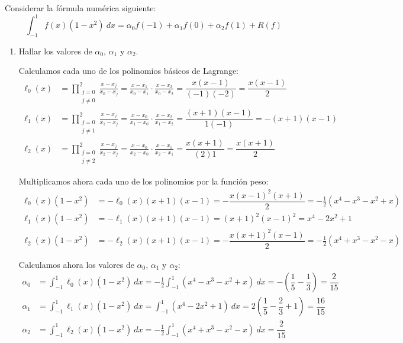 \begin{ejercicio}
    Considerar la fórmula numérica siguiente:
    \begin{equation*}
        \int_{-1}^1f(x)(1-x^2)\ dx=\alpha_0f(-1)+\alpha_1f(0)+\alpha_2f(1)+R(f)
    \end{equation*}
    \begin{enumerate}
        \item Hallar los valores de $\alpha_0$, $\alpha_1$ y $\alpha_2$.
        
        Calculamos cada uno de los polinomios básicos de Lagrange:
        \begin{align*}
            \ell_0(x)
            &=\prod_{\substack{j=0\\j\neq 0}}^2\frac{x-x_j}{x_0-x_j}
            = \frac{x-x_1}{x_0-x_1}\cdot\frac{x-x_2}{x_0-x_2}
            = \dfrac{x(x-1)}{(-1)(-2)} = \dfrac{x(x-1)}{2}\\
            \ell_1(x)
            &= \prod_{\substack{j=0\\j\neq 1}}^2\frac{x-x_j}{x_1-x_j}
            = \frac{x-x_0}{x_1-x_0}\cdot\frac{x-x_2}{x_1-x_2}
            = \dfrac{(x+1)(x-1)}{1(-1)} = -(x+1)(x-1)\\
            \ell_2(x)
            &= \prod_{\substack{j=0\\j\neq 2}}^2\frac{x-x_j}{x_2-x_j}
            = \frac{x-x_0}{x_2-x_0}\cdot\frac{x-x_1}{x_2-x_1}
            = \dfrac{x(x+1)}{(2)1} = \dfrac{x(x+1)}{2}
        \end{align*}

        Multiplicamos ahora cada uno de los polinomios por la función peso:
        \begin{align*}
            \ell_0(x)(1-x^2) &= -\ell_0(x)(x+1)(x-1) = -\dfrac{x(x-1)^2(x+1)}{2} = -\frac{1}{2}(x^4-x^3-x^2+x)\\
            \ell_1(x)(1-x^2) &= -\ell_1(x)(x+1)(x-1) = (x+1)^2(x-1)^2 = x^4-2x^2+1\\
            \ell_2(x)(1-x^2) &= -\ell_2(x)(x+1)(x-1) = -\dfrac{x(x+1)^2(x-1)}{2} = -\frac{1}{2}(x^4+x^3-x^2-x)
        \end{align*}

        Calculamos ahora los valores de $\alpha_0$, $\alpha_1$ y $\alpha_2$:
        \begin{align*}
            \alpha_0 &= \int_{-1}^1\ell_0(x)(1-x^2)\ dx = -\frac{1}{2}\int_{-1}^1(x^4-x^3-x^2+x)\ dx = -\left(\dfrac{1}{5}-\dfrac{1}{3}\right) = \dfrac{2}{15}\\
            \alpha_1 &= \int_{-1}^1\ell_1(x)(1-x^2)\ dx = \int_{-1}^1(x^4-2x^2+1)\ dx = 2\left(\dfrac{1}{5}-\dfrac{2}{3}+1\right) = \dfrac{16}{15}\\
            \alpha_2 &= \int_{-1}^1\ell_2(x)(1-x^2)\ dx = -\frac{1}{2}\int_{-1}^1(x^4+x^3-x^2-x)\ dx = \dfrac{2}{15}
        \end{align*}


\end{enumerate}
\end{ejercicio}
